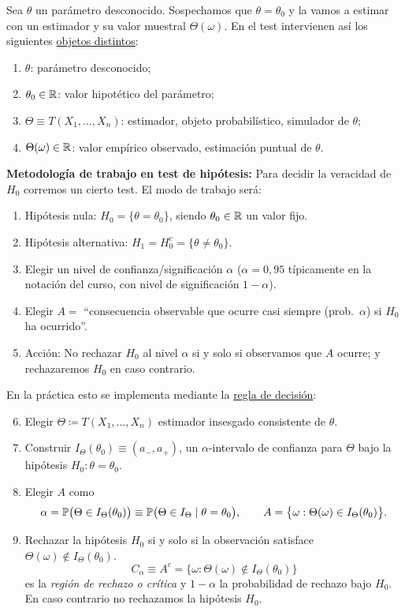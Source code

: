 \begin{definicion}
Sea $\theta$ un parámetro desconocido. Sospechamos que $\theta = \theta_0$ y la vamos a estimar con un estimador y su valor muestral $\Theta(\omega)$. En el test intervienen así los siguientes \underline{objetos distintos}:
\begin{enumerate}[label=(\alph*)]
  \item $\theta$: parámetro desconocido;
  \item $\theta_0 \in \mathbb{R}$: valor hipotético del parámetro;
  \item $\Theta \equiv T(X_1, \dots, X_n)$: estimador, objeto probabilístico, simulador de $\theta$;
  \item $\Theta(\omega) \in \mathbb{R}$: valor empírico observado, estimación puntual de $\theta$.
\end{enumerate}

\noindent \textbf{Metodología de trabajo en test de hipótesis:} Para decidir la veracidad de $H_0$ corremos un cierto test. El modo de trabajo será:
\begin{enumerate}
  \item Hipótesis nula: $H_0 = \{\theta = \theta_0\}$, siendo $\theta_0 \in \mathbb{R}$ un valor fijo.
  \item Hipótesis alternativa: $H_1 = H_0^c = \{\theta \neq \theta_0\}$.
  \item Elegir un nivel de confianza/significación $\alpha$ ($\alpha = 0{,}95$ típicamente en la notación del curso, con nivel de significación $1-\alpha$).
  \item Elegir $A =$ ``consecuencia observable que ocurre casi siempre (prob.\ $\alpha$) si $H_0$ ha ocurrido''.
  \item Acción: No rechazar $H_0$ al nivel $\alpha$ si y solo si observamos que $A$ ocurre; y rechazaremos $H_0$ en caso contrario.
\end{enumerate}
En la práctica esto se implementa mediante la \underline{regla de decisión}:
\begin{enumerate}[label=\arabic*.]
  \setcounter{enumi}{5}
  \item Elegir $\Theta \coloneqq T(X_1, \dots, X_n)$ estimador insesgado consistente de $\theta$.
  \item Construir $I_\Theta(\theta_0) \equiv (a_-, a_+)$, un $\alpha$-intervalo de confianza para $\Theta$ bajo la hipótesis $H_0 : \theta = \theta_0$.
  \item Elegir $A$ como
  \[
    \alpha = \mathbb{P}\bigl(\Theta \in I_\Theta(\theta_0)\bigr) \equiv \mathbb{P}\bigl(\Theta \in I_\Theta \mid \theta = \theta_0\bigr), \qquad A = \bigl\{\omega : \Theta(\omega) \in I_\Theta(\theta_0)\bigr\}.
  \]
  \item Rechazar la hipótesis $H_0$ si y solo si la observación satisface $\Theta(\omega) \notin I_\Theta(\theta_0)$.
  \[
    C_\alpha \equiv A^c = \bigl\{\omega : \Theta(\omega) \notin I_\Theta(\theta_0)\bigr\}
  \]
  es la \emph{región de rechazo o crítica} y $1-\alpha$ la probabilidad de rechazo bajo $H_0$. En caso contrario no rechazamos la hipótesis $H_0$.
\end{enumerate}
\end{definicion}

